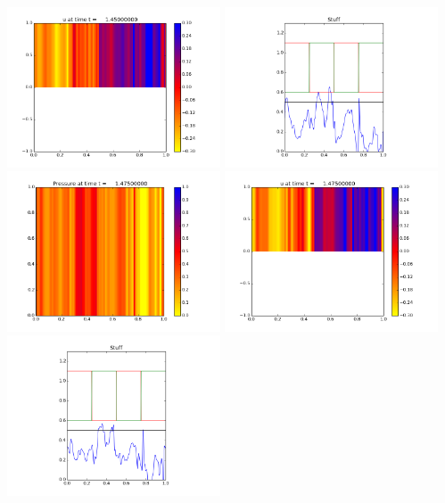 \documentclass[11pt]{article}
\begin{document}
\includegraphics[width=0.475\textwidth]{frame0058fig1.png}
\vskip 10pt 
\includegraphics[width=0.475\textwidth]{frame0058fig3.png}
\vskip 10pt 
\includegraphics[width=0.475\textwidth]{frame0059fig0.png}
\includegraphics[width=0.475\textwidth]{frame0059fig1.png}
\vskip 10pt 
\includegraphics[width=0.475\textwidth]{frame0059fig3.png}
\end{document}
